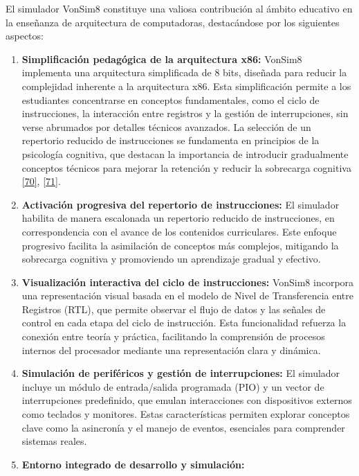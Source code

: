 \documentclass[12pt,oneside]{templates/unerthesis}
\begin{document}
El simulador VonSim8 constituye una valiosa contribución al ámbito educativo en la enseñanza de arquitectura de computadoras, destacándose por los siguientes aspectos:

\begin{enumerate}
\def\labelenumi{\arabic{enumi}.}
\item
  \textbf{Simplificación pedagógica de la arquitectura x86:}
  VonSim8 implementa una arquitectura simplificada de 8 bits, diseñada para reducir la complejidad inherente a la arquitectura x86. Esta simplificación permite a los estudiantes concentrarse en conceptos fundamentales, como el ciclo de instrucciones, la interacción entre registros y la gestión de interrupciones, sin verse abrumados por detalles técnicos avanzados. La selección de un repertorio reducido de instrucciones se fundamenta en principios de la psicología cognitiva, que destacan la importancia de introducir gradualmente conceptos técnicos para mejorar la retención y reducir la sobrecarga cognitiva \protect\hyperlink{ref-nationalacademies2018how}{{[}70{]}}, \protect\hyperlink{ref-sweller2010cognitive}{{[}71{]}}.
\item
  \textbf{Activación progresiva del repertorio de instrucciones:}
  El simulador habilita de manera escalonada un repertorio reducido de instrucciones, en correspondencia con el avance de los contenidos curriculares. Este enfoque progresivo facilita la asimilación de conceptos más complejos, mitigando la sobrecarga cognitiva y promoviendo un aprendizaje gradual y efectivo.
\item
  \textbf{Visualización interactiva del ciclo de instrucciones:}
  VonSim8 incorpora una representación visual basada en el modelo de Nivel de Transferencia entre Registros (RTL), que permite observar el flujo de datos y las señales de control en cada etapa del ciclo de instrucción. Esta funcionalidad refuerza la conexión entre teoría y práctica, facilitando la comprensión de procesos internos del procesador mediante una representación clara y dinámica.
\item
  \textbf{Simulación de periféricos y gestión de interrupciones:}
  El simulador incluye un módulo de entrada/salida programada (PIO) y un vector de interrupciones predefinido, que emulan interacciones con dispositivos externos como teclados y monitores. Estas características permiten explorar conceptos clave como la asincronía y el manejo de eventos, esenciales para comprender sistemas reales.
\item
  \textbf{Entorno integrado de desarrollo y simulación:}

\end{enumerate}
\end{document}
